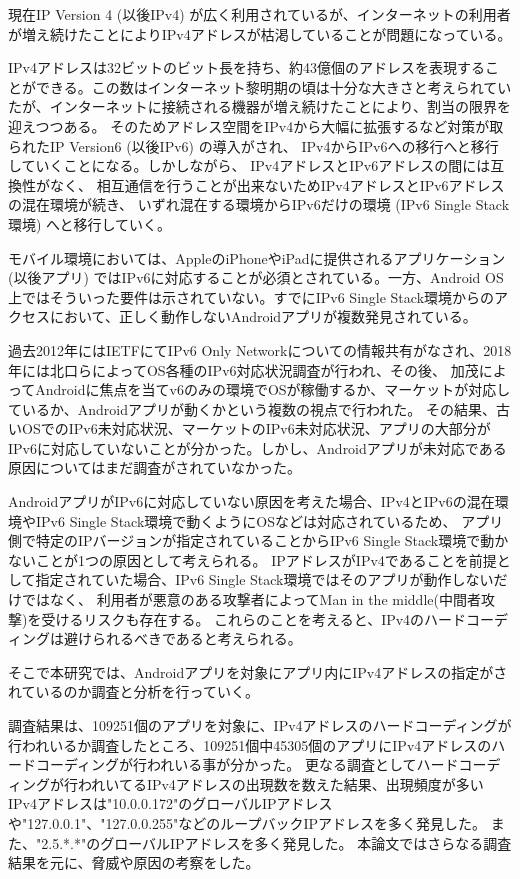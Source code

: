 \documentclass[a4j]{jarticle}
\begin{document}
現在IP Version 4 (以後IPv4) が広く利用されているが、インターネットの利用者が増え続けたことによりIPv4アドレスが枯渇していることが問題になっている。

IPv4アドレスは32ビットのビット長を持ち、約43億個のアドレスを表現することができる。この数はインターネット黎明期の頃は十分な大きさと考えられていたが、インターネットに接続される機器が増え続けたことにより、割当の限界を迎えつつある。
そのためアドレス空間をIPv4から大幅に拡張するなど対策が取られたIP Version6 (以後IPv6) の導入がされ、
IPv4からIPv6への移行へと移行していくことになる。しかしながら、
IPv4アドレスとIPv6アドレスの間には互換性がなく、
相互通信を行うことが出来ないためIPv4アドレスとIPv6アドレスの混在環境が続き、
いずれ混在する環境からIPv6だけの環境 (IPv6 Single Stack環境) へと移行していく。

モバイル環境においては、AppleのiPhoneやiPadに提供されるアプリケーション (以後アプリ) ではIPv6に対応することが必須とされている\cite{one}。一方、Android OS上ではそういった要件は示されていない。すでにIPv6 Single Stack環境からのアクセスにおいて、正しく動作しないAndroidアプリが複数発見されている。

過去2012年にはIETFにてIPv6 Only Networkについての情報共有がなされ\cite{two}、2018年には北口らによってOS各種のIPv6対応状況調査が行われ\cite{three}、その後、
加茂によってAndroidに焦点を当てv6のみの環境でOSが稼働するか、マーケットが対応しているか、Androidアプリが動くかという複数の視点で行われた\cite{four}。
その結果、古いOSでのIPv6未対応状況、マーケットのIPv6未対応状況、アプリの大部分がIPv6に対応していないことが分かった。しかし、Androidアプリが未対応である原因についてはまだ調査がされていなかった。

AndroidアプリがIPv6に対応していない原因を考えた場合、IPv4とIPv6の混在環境やIPv6 Single Stack環境で動くようにOSなどは対応されているため、
アプリ側で特定のIPバージョンが指定されていることからIPv6 Single Stack環境で動かないことが1つの原因として考えられる。
IPアドレスがIPv4であることを前提として指定されていた場合、IPv6 Single Stack環境ではそのアプリが動作しないだけではなく、
利用者が悪意のある攻撃者によってMan in the middle(中間者攻撃)を受けるリスクも存在する。
これらのことを考えると、IPv4のハードコーディングは避けられるべきであると考えられる。

そこで本研究では、Androidアプリを対象にアプリ内にIPv4アドレスの指定がされているのか調査と分析を行っていく。

調査結果は、109251個のアプリを対象に、IPv4アドレスのハードコーディングが行われいるか調査したところ、109251個中45305個のアプリにIPv4アドレスのハードコーディングが行われいる事が分かった。
更なる調査としてハードコーディングが行われいてるIPv4アドレスの出現数を数えた結果、出現頻度が多いIPv4アドレスは"10.0.0.172"のグローバルIPアドレスや"127.0.0.1"、"127.0.0.255"などのループバックIPアドレスを多く発見した。
また、"2.5.*.*"のグローバルIPアドレスを多く発見した。
本論文ではさらなる調査結果を元に、脅威や原因の考察をした。
\end{document}
